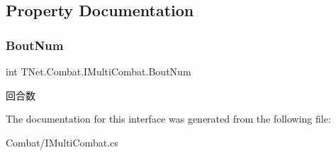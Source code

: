 \subsection{Property Documentation}
\mbox{\label{interface_t_net_1_1_combat_1_1_i_multi_combat_a95c39b5097598666379c209ba61ddfeb}} 
\subsubsection{\texorpdfstring{Bout\+Num}{BoutNum}}
{\footnotesize\ttfamily int T\+Net.\+Combat.\+I\+Multi\+Combat.\+Bout\+Num\hspace{0.3cm}{\ttfamily [get]}}



回合数 



The documentation for this interface was generated from the following file\+:\begin{DoxyCompactItemize}
\item 
Combat/I\+Multi\+Combat.\+cs\end{DoxyCompactItemize}
